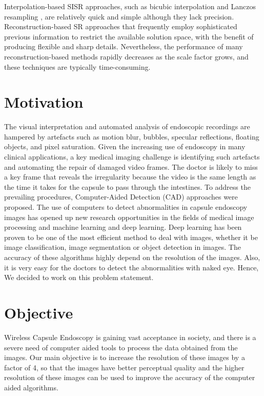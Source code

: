 Interpolation-based SISR approaches, such as bicubic interpolation\cite{Bicubic} and Lanczos resampling \cite{lanczos}, are relatively quick and simple although they lack precision. Reconstruction-based SR approaches that frequently employ sophisticated previous information to restrict the available solution space, with the benefit of producing flexible and sharp details. Nevertheless, the performance of many reconstruction-based methods rapidly decreases as the scale factor grows, and these techniques are typically time-consuming.
\newpage
\section{Motivation}
The visual interpretation and automated analysis of endoscopic recordings are hampered by artefacts such as motion blur, bubbles, specular reflections, floating objects, and pixel saturation. Given the increasing use of endoscopy in many clinical applications, a key medical imaging challenge is identifying such artefacts and automating the repair of damaged video frames. The doctor is likely to miss a key frame that reveals the irregularity because the video is the same length as the time it takes for the capsule to pass through the intestines. To address the prevailing procedures, Computer-Aided Detection (CAD) approaches were proposed.
The use of computers to detect abnormalities in capsule endoscopy images has opened up new research opportunities in the fields of medical image processing and machine learning and deep learning. Deep learning has been proven to be one of the most efficient method to deal with images, whether it be image classification, image segmentation or object detection in images.
The accuracy of these algorithms highly depend on the resolution of the images. Also, it is very easy for the doctors to detect the abnormalities with naked eye. Hence, We decided to work on this problem statement. 
\section{Objective}
Wireless Capsule Endoscopy is gaining vast acceptance in society, and there is a severe need of computer aided tools to process the data obtained from the images. Our main objective is to increase the resolution of these images by a factor of 4, so that the images have better perceptual quality and the higher resolution of these images can be used to improve the accuracy of the computer aided algorithms.
